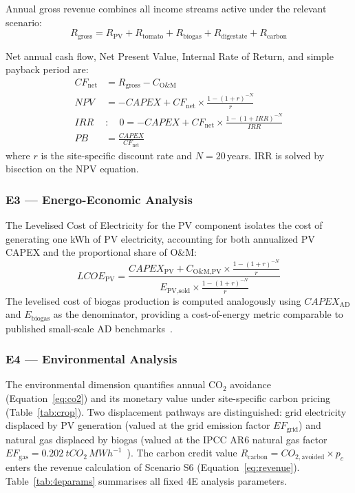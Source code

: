 Annual gross revenue combines all income streams active under the
relevant scenario:
\begin{equation}
	R_{\text{gross}} = R_{\text{PV}} + R_{\text{tomato}}
	+ R_{\text{biogas}} + R_{\text{digestate}}
	+ R_{\text{carbon}}
	\label{eq:revenue}
\end{equation}

Net annual cash flow, Net Present Value, Internal Rate of Return,
and simple payback period are:
\begin{align}
	CF_{\text{net}} &= R_{\text{gross}} - C_{\text{O\&M}}
	\label{eq:cf} \\[4pt]
	NPV &= -CAPEX + CF_{\text{net}}
	\times \frac{1-(1+r)^{-N}}{r}
	\label{eq:npv} \\[4pt]
	IRR &: \quad 0 = -CAPEX + CF_{\text{net}}
	\times \frac{1-(1+IRR)^{-N}}{IRR}
	\label{eq:irr} \\[4pt]
	PB &= \frac{CAPEX}{CF_{\text{net}}}
	\label{eq:pb}
\end{align}
where $r$ is the site-specific discount rate and $N = 20$\,years.
IRR is solved by bisection on the NPV equation.

\subsubsection{E3 --- Energo-Economic Analysis}

\hspace{1cm}The Levelised Cost of Electricity for the PV component
isolates the cost of generating one kWh of PV electricity, accounting
for both annualized PV CAPEX and the proportional share of O\&M:
\begin{equation}
	LCOE_{\text{PV}} = \frac{CAPEX_{\text{PV}}
		+ C_{\text{O\&M,PV}} \times \frac{1-(1+r)^{-N}}{r}}
	{E_{\text{PV,sold}} \times \frac{1-(1+r)^{-N}}{r}}
	\label{eq:lcoe}
\end{equation}
The levelised cost of biogas production is computed analogously
using $CAPEX_{\text{AD}}$ and $E_{\text{biogas}}$ as the
denominator, providing a cost-of-energy metric comparable to
published small-scale AD benchmarks~\citep{pal2024}.

\subsubsection{E4 --- Environmental Analysis}

\hspace{1cm}The environmental dimension quantifies annual CO$_2$
avoidance (Equation~\ref{eq:co2}) and its monetary value under
site-specific carbon pricing (Table~\ref{tab:crop}). Two
displacement pathways are distinguished: grid electricity displaced
by PV generation (valued at the grid emission factor
$EF_{\text{grid}}$) and natural gas displaced by biogas (valued
at the IPCC AR6 natural gas factor
$EF_{\text{gas}} = \SI{0.202}{tCO_2\,MWh^{-1}}$~\citep{ipcc2022}).
The carbon credit value $R_{\text{carbon}} = CO_{2,\text{avoided}}
\times p_c$ enters the revenue calculation of Scenario S6
(Equation~\ref{eq:revenue}). Table~\ref{tab:4eparams} summarises
all fixed 4E analysis parameters.

